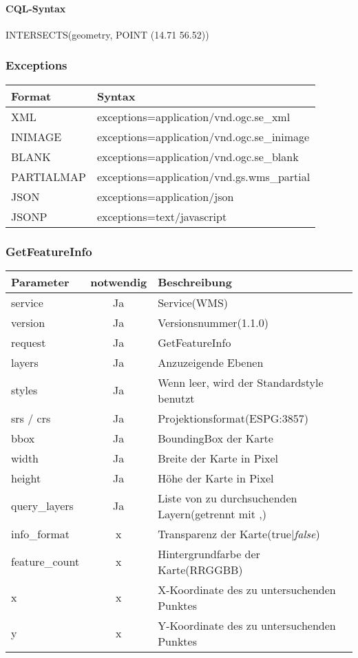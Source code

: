\paragraph{CQL-Syntax\\}
INTERSECTS(geometry, POINT (14.71 56.52))



\subsubsection{Exceptions}
\begin{tabular}{ll} 
Format & Syntax \\ 
\hline 
XML & exceptions=application/vnd.ogc.se\_xml\\ 
\hline 
INIMAGE & exceptions=application/vnd.ogc.se\_inimage \\ 
\hline 
BLANK & exceptions=application/vnd.ogc.se\_blank \\ 
\hline 
PARTIALMAP & exceptions=application/vnd.gs.wms\_partial \\ 
\hline 
JSON & exceptions=application/json \\ 
\hline 
JSONP & exceptions=text/javascript \\ 
\hline 
\end{tabular} 
\subsubsection{GetFeatureInfo}
\begin{tabular}{lcl}
\textbf{Parameter} & \textbf{notwendig} & \textbf{Beschreibung}\\
\hline 
service & Ja & Service(WMS) \\ 
\hline 
version & Ja & Versionsnummer(1.1.0) \\ 
\hline 
request & Ja & GetFeatureInfo \\ 
\hline 
layers & Ja & Anzuzeigende Ebenen \\ 
\hline 
styles & Ja & Wenn leer, wird der Standardstyle benutzt \\ 
\hline 
srs / crs & Ja & Projektionsformat(ESPG:3857) \\ 
\hline 
bbox & Ja & BoundingBox der Karte \\ 
\hline 
width & Ja & Breite der Karte in Pixel \\ 
\hline 
height & Ja & H\"ohe der Karte in Pixel \\ 
\hline 
query\_layers & Ja & Liste von zu durchsuchenden Layern(getrennt mit ,)\\
\hline 
info\_format & x & Transparenz der Karte(true|\emph{false}) \\ 
\hline 
feature\_count & x & Hintergrundfarbe der Karte(RRGGBB) \\ 
\hline 
x & x & X-Koordinate des zu untersuchenden Punktes \\ 
\hline 
y & x & Y-Koordinate des zu untersuchenden Punktes \\ 
\hline 
\end{tabular} 

